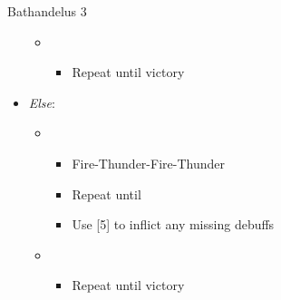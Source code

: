 \begin{battle}{Bathandelus 3}
\begin{multicols}{2}
\begin{itemize}
    \begin{itemize}
        \item \first
        \begin{itemize}
            \item Repeat until victory
        \end{itemize}
    \end{itemize}
    \item \textit{Else}:
    \begin{itemize}
        \item \sixth
            \begin{itemize}
                \item Fire-Thunder-Fire-Thunder
                \item Repeat until \stagger
                \item Use [5] to inflict any missing debuffs
            \end{itemize}
        \item \first
        \begin{itemize}
            \item Repeat until victory
        \end{itemize}
    \end{itemize}
\end{itemize}
\end{multicols}
\end{battle}
